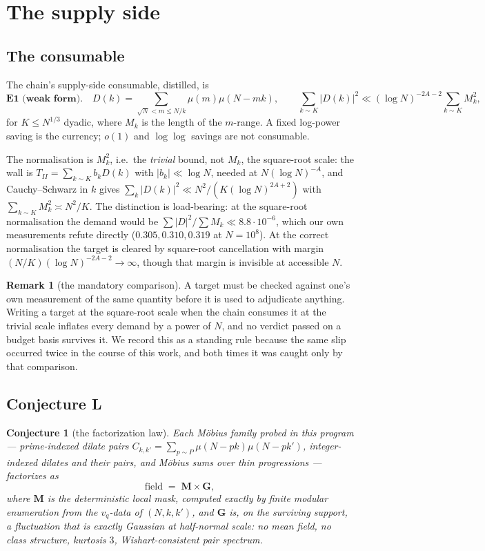 \documentclass[11pt,a4paper]{article}
\theoremstyle{plain}
\newtheorem{conjecture}[theorem]{Conjecture}
\theoremstyle{definition}
\newtheorem{remark}[theorem]{Remark}
\begin{document}
\section{The supply side}\label{sec:supply}

\subsection{The consumable}

The chain's supply-side consumable, distilled, is
\[
  \textbf{E1 (weak form).}\quad
  D(k) = \!\!\sum_{\sqrt N < m \le N/k}\!\! \mu(m)\mu(N-mk),
  \qquad
  \sum_{k\sim K}|D(k)|^2 \ll (\log N)^{-2A-2}\sum_{k\sim K} M_k^2,
\]
for $K \le N^{1/3}$ dyadic, where $M_k$ is the length of the $m$-range.
A fixed log-power saving is the currency; $o(1)$ and $\log\log$ savings
are not consumable.

The normalisation is $M_k^2$, i.e.\ the \emph{trivial} bound, not
$M_k$, the square-root scale: the wall is
$T_{II} = \sum_{k\sim K}b_kD(k)$ with $|b_k|\ll\log N$, needed at
$N(\log N)^{-A}$, and Cauchy--Schwarz in $k$ gives
$\sum_k|D(k)|^2 \ll N^2/(K(\log N)^{2A+2})$ with
$\sum_{k\sim K}M_k^2 \asymp N^2/K$. The distinction is load-bearing:
at the square-root normalisation the demand would be
$\sum|D|^2/\sum M_k \ll 8.8\cdot10^{-6}$, which our own measurements
refute directly ($0.305, 0.310, 0.319$ at $N=10^8$). At the correct
normalisation the target is cleared by square-root cancellation with
margin $(N/K)(\log N)^{-2A-2}\to\infty$, though that margin is
invisible at accessible $N$.

\begin{remark}[the mandatory comparison]\label{rem:scale}
A target must be checked against one's own measurement of the same
quantity before it is used to adjudicate anything. Writing a target at
the square-root scale when the chain consumes it at the trivial scale
inflates every demand by a power of $N$, and no verdict passed on a
budget basis survives it. We record this as a standing rule because
the same slip occurred twice in the course of this work, and both times
it was caught only by that comparison.
\end{remark}

\subsection{Conjecture L}

\begin{conjecture}[the factorization law]\label{conj:L}
Each M\"obius family probed in this program --- prime-indexed dilate
pairs $C_{k,k'} = \sum_{p\sim P}\mu(N-pk)\mu(N-pk')$, integer-indexed
dilates and their pairs, and M\"obius sums over thin progressions ---
factorizes as
\[
  \text{field} \;=\; \mathbf M \times \mathbf G,
\]
where $\mathbf M$ is the deterministic local mask, computed exactly by
finite modular enumeration from the $v_q$-data of $(N,k,k')$, and
$\mathbf G$ is, on the surviving support, a fluctuation that is
exactly Gaussian at half-normal scale: no mean field, no class
structure, kurtosis $3$, Wishart-consistent pair spectrum.
\end{conjecture}
\end{document}
